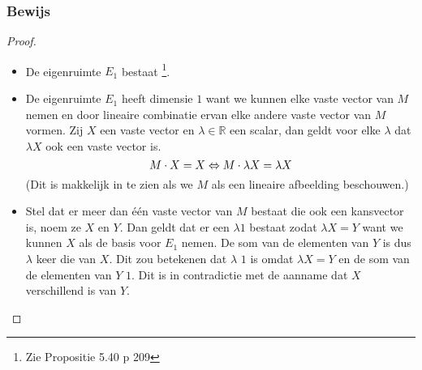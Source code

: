 \documentclass[lineaire_algebra_oplossingen.tex]{subfiles}
\begin{document}
\subsubsection*{Bewijs}
\begin{proof}
\begin{itemize}
\item De eigenruimte $E_1$ bestaat \footnote{Zie Propositie 5.40 p 209}. 
\item De eigenruimte $E_1$ heeft dimensie $1$ want we kunnen elke vaste vector van $M$ nemen en door lineaire combinatie ervan elke andere vaste vector van $M$ vormen. Zij $X$ een vaste vector en $\lambda \in \mathbb{R}$ een scalar, dan geldt voor elke $\lambda$ dat $\lambda X$ ook een vaste vector is.
\[
M\cdot X = X\\ \Leftrightarrow M\cdot \lambda X = \lambda X 
\]
(Dit is makkelijk in te zien als we $M$ als een lineaire afbeelding beschouwen.)
\item Stel dat er meer dan \'e\'en vaste vector van $M$ bestaat die ook een kansvector is, noem ze $X$ en $Y$.
Dan geldt dat er een $\lambda 1$ bestaat zodat $\lambda X = Y$ want we kunnen $X$ als de basis voor $E_1$ nemen. De som van de elementen van $Y$ is dus $\lambda$ keer die van $X$. Dit zou betekenen dat $\lambda$ $1$ is omdat $\lambda X = Y$ en de som van de elementen van $Y$ $1$. Dit is in contradictie met de aanname dat $X$ verschillend is van $Y$.
\end{itemize}
\end{proof}
\end{document}
